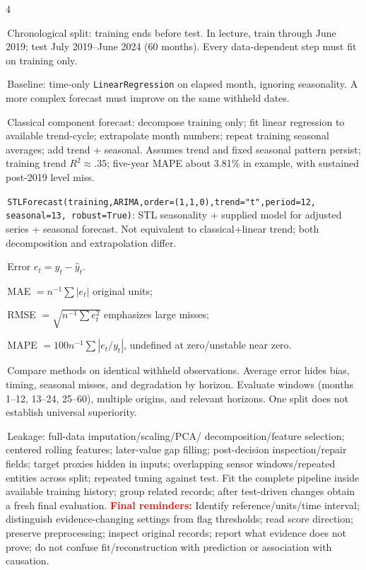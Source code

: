 \documentclass[10pt]{article}
\newcommand{\topic}[1]{\vspace{1.2pt}{\color{blue}\bfseries\fontsize{5.8}{6.0}\selectfont #1}\par\vspace{0.2pt}}
\newcommand{\trap}[1]{\textcolor{red}{\textbf{#1}}}
\newcommand{\code}[1]{\texttt{#1}}
\newcommand{\bitem}{\par\hangindent=0.08in\hangafter=1\textbullet\,}
\begin{document}
\begin{multicols*}{4}
\topic{FORECAST DESIGN}
\bitem Chronological split: training ends before test. In lecture, train through June 2019; test July 2019--June 2024 (60 months). Every data-dependent step must fit on training only.
\bitem Baseline: time-only \code{LinearRegression} on elapsed month, ignoring seasonality. A more complex forecast must improve on the same withheld dates.
\bitem Classical component forecast: decompose training only; fit linear regression to available trend-cycle; extrapolate month numbers; repeat training seasonal averages; add trend + seasonal. Assumes trend and fixed seasonal pattern persist; training trend $R^2\approx.35$; five-year MAPE about 3.81\% in example, with sustained post-2019 level miss.
\bitem \code{STLForecast(training,ARIMA,order=(1,1,0),trend="t",period=12, seasonal=13, robust=True)}: STL seasonality + supplied model for adjusted series + seasonal forecast. Not equivalent to classical+linear trend; both decomposition and extrapolation differ.
\bitem Error $e_t=y_t-\hat y_t$. 
\bitem MAE $=n^{-1}\sum|e_t|$ original units; 

\bitem RMSE $=\sqrt{n^{-1}\sum e_t^2}$ emphasizes large misses; 

\bitem MAPE $=100n^{-1}\sum|e_t/y_t|$, undefined at zero/unstable near zero.

\bitem Compare methods on identical withheld observations. Average error hides bias, timing, seasonal misses, and degradation by horizon. Evaluate windows (months 1--12, 13--24, 25--60), multiple origins, and relevant horizons. One split does not establish universal superiority.

\topic{LEAKAGE + FINAL TRAPS}
\bitem Leakage: full-data imputation/scaling/PCA/ decomposition/feature selection; centered rolling features; later-value gap filling; post-decision inspection/repair fields; target proxies hidden in inputs; overlapping sensor windows/repeated entities across split; repeated tuning against test. Fit the complete pipeline inside available training history; group related records; after test-driven changes obtain a fresh final evaluation.
\trap{Final reminders:} Identify reference/units/time interval; distinguish evidence-changing settings from flag thresholds; read score direction; preserve preprocessing; inspect original records; report what evidence does not prove; do not confuse fit/reconstruction with prediction or association with causation.
\end{multicols*}
\end{document}
